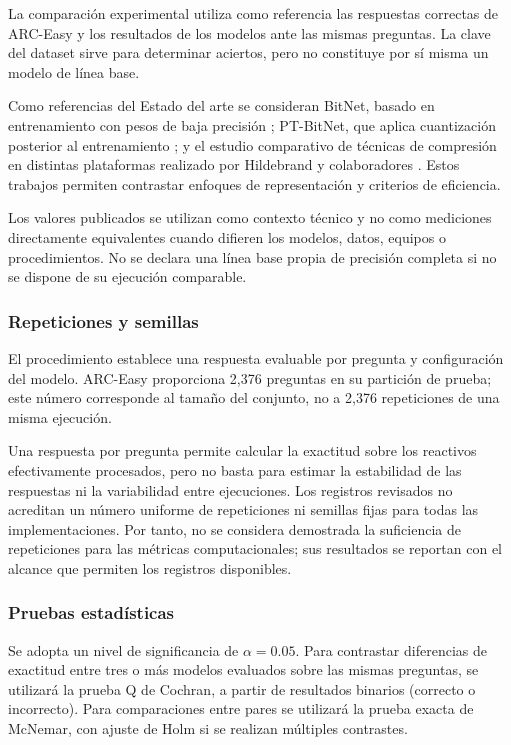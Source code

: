 La comparación experimental utiliza como referencia las respuestas correctas de ARC-Easy y los resultados de los modelos ante las mismas preguntas. La clave del dataset sirve para determinar aciertos, pero no constituye por sí misma un modelo de línea base.

Como referencias del Estado del arte se consideran BitNet, basado en entrenamiento con pesos de baja precisión \cite{bitnetJMLR2025}; PT-BitNet, que aplica cuantización posterior al entrenamiento \cite{ptBitnet2025}; y el estudio comparativo de técnicas de compresión en distintas plataformas realizado por Hildebrand y colaboradores \cite{compressionComparison2026}. Estos trabajos permiten contrastar enfoques de representación y criterios de eficiencia.

Los valores publicados se utilizan como contexto técnico y no como mediciones directamente equivalentes cuando difieren los modelos, datos, equipos o procedimientos. No se declara una línea base propia de precisión completa si no se dispone de su ejecución comparable.

\subsubsection{Repeticiones y semillas}

El procedimiento establece una respuesta evaluable por pregunta y configuración del modelo. ARC-Easy proporciona 2,376 preguntas en su partición de prueba; este número corresponde al tamaño del conjunto, no a 2,376 repeticiones de una misma ejecución.

Una respuesta por pregunta permite calcular la exactitud sobre los reactivos efectivamente procesados, pero no basta para estimar la estabilidad de las respuestas ni la variabilidad entre ejecuciones. Los registros revisados no acreditan un número uniforme de repeticiones ni semillas fijas para todas las implementaciones. Por tanto, no se considera demostrada la suficiencia de repeticiones para las métricas computacionales; sus resultados se reportan con el alcance que permiten los registros disponibles.

\subsubsection{Pruebas estadísticas}

Se adopta un nivel de significancia de $\alpha=0.05$. Para contrastar diferencias de exactitud entre tres o más modelos evaluados sobre las mismas preguntas, se utilizará la prueba Q de Cochran, a partir de resultados binarios (correcto o incorrecto). Para comparaciones entre pares se utilizará la prueba exacta de McNemar, con ajuste de Holm si se realizan múltiples contrastes.

